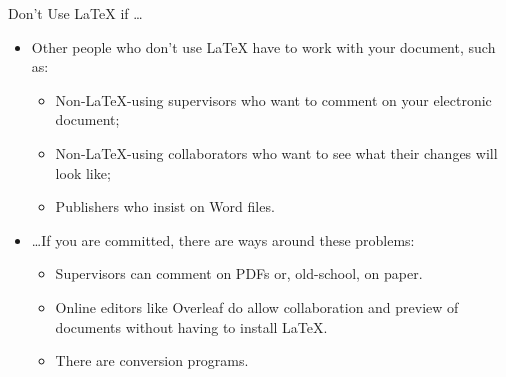 \begin{frame}[fragile]{Don't Use \LaTeX{} if \dots}

\begin{itemize}
\item Other people who don't use \LaTeX{} have to work with your 
document, such as:
\begin{itemize}
\item Non-\LaTeX-using supervisors who want to comment on your 
electronic document;
\item Non-\LaTeX-using collaborators who want to see what their 
changes will look like;
\item {\color{red} Publishers who insist on Word files.}
\end{itemize}
\item \dots If you are committed, there are ways around these problems:
\begin{itemize}
\item Supervisors can comment on PDFs or, old-school, on paper.
\item Online editors like Overleaf do allow collaboration and preview
  of documents without having to install \LaTeX.
\item There are conversion programs.
\end{itemize}
\end{itemize}

\end{frame}

